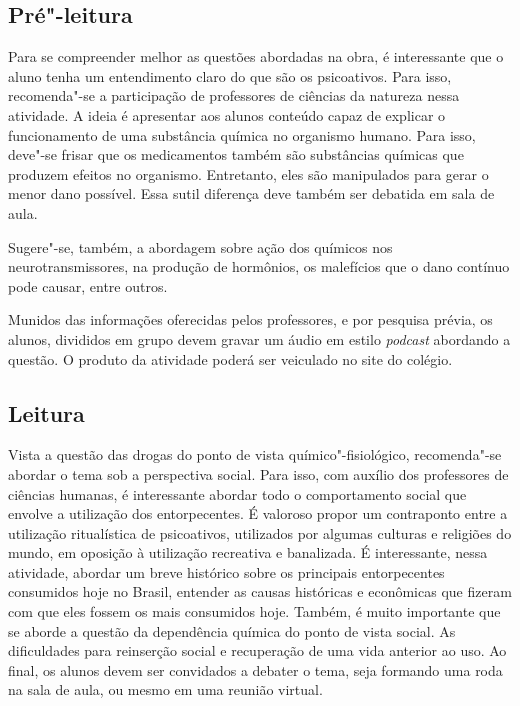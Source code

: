 \documentclass[11pt]{extarticle}
\begin{document}
\subsection{Pré"-leitura}

Para se compreender melhor as questões abordadas na obra, é
interessante que o aluno tenha um entendimento claro do que são os
psicoativos. Para isso, recomenda"-se a participação de professores de
ciências da natureza nessa atividade. A ideia é apresentar aos alunos
conteúdo capaz de explicar o funcionamento de uma substância química no
organismo humano. Para isso, deve"-se frisar que os medicamentos também
são substâncias químicas que produzem efeitos no organismo. Entretanto,
eles são manipulados para gerar o menor dano possível. Essa sutil
diferença deve também ser debatida em sala de aula.

Sugere"-se, também, a abordagem sobre ação dos químicos nos
neurotransmissores, na produção de hormônios, os malefícios que o dano
contínuo pode causar, entre outros.

Munidos das informações oferecidas pelos professores, e por pesquisa
prévia, os alunos, divididos em grupo devem gravar um áudio em estilo
\emph{podcast} abordando a questão. O produto da atividade poderá ser
veiculado no site do colégio.


\subsection{Leitura}

Vista a questão das drogas do ponto de vista
químico"-fisiológico, recomenda"-se abordar o tema sob a perspectiva
social. Para isso, com auxílio dos professores de ciências humanas, é
interessante abordar todo o comportamento social que envolve a
utilização dos entorpecentes. É valoroso propor um contraponto entre a
utilização ritualística de psicoativos, utilizados por algumas culturas
e religiões do mundo, em oposição à utilização recreativa e banalizada.
É interessante, nessa atividade, abordar um breve histórico sobre os
principais entorpecentes consumidos hoje no Brasil, entender as causas
históricas e econômicas que fizeram com que eles fossem os mais
consumidos hoje. Também, é muito importante que se aborde a questão da
dependência química do ponto de vista social. As dificuldades para
reinserção social e recuperação de uma vida anterior ao uso. Ao final,
os alunos devem ser convidados a debater o tema, seja formando uma roda
na sala de aula, ou mesmo em uma reunião virtual.
\end{document}
